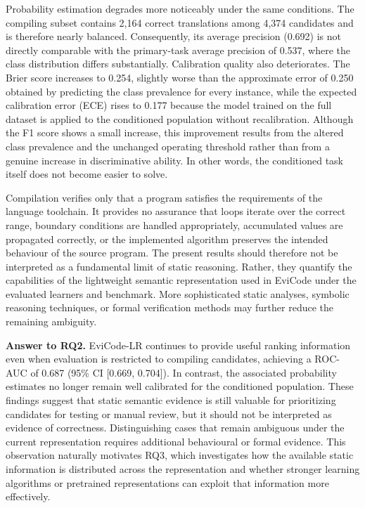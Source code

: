\documentclass[conference]{IEEEtran}
\begin{document}
Probability estimation degrades more noticeably under the same conditions. The compiling subset contains 2,164 correct translations among 4,374 candidates and is therefore nearly balanced. Consequently, its average precision (0.692) is not directly comparable with the primary-task average precision of 0.537, where the class distribution differs substantially. Calibration quality also deteriorates. The Brier score increases to 0.254, slightly worse than the approximate error of 0.250 obtained by predicting the class prevalence for every instance, while the expected calibration error (ECE) rises to 0.177 because the model trained on the full dataset is applied to the conditioned population without recalibration. Although the F1 score shows a small increase, this improvement results from the altered class prevalence and the unchanged operating threshold rather than from a genuine increase in discriminative ability. In other words, the conditioned task itself does not become easier to solve.

Compilation verifies only that a program satisfies the requirements of the language toolchain. It provides no assurance that loops iterate over the correct range, boundary conditions are handled appropriately, accumulated values are propagated correctly, or the implemented algorithm preserves the intended behaviour of the source program. The present results should therefore not be interpreted as a fundamental limit of static reasoning. Rather, they quantify the capabilities of the lightweight semantic representation used in EviCode under the evaluated learners and benchmark. More sophisticated static analyses, symbolic reasoning techniques, or formal verification methods may further reduce the remaining ambiguity.

\textbf{Answer to RQ2.} EviCode-LR continues to provide useful ranking information even when evaluation is restricted to compiling candidates, achieving a ROC-AUC of 0.687 (95\% CI [0.669, 0.704]). In contrast, the associated probability estimates no longer remain well calibrated for the conditioned population. These findings suggest that static semantic evidence is still valuable for prioritizing candidates for testing or manual review, but it should not be interpreted as evidence of correctness. Distinguishing cases that remain ambiguous under the current representation requires additional behavioural or formal evidence. This observation naturally motivates RQ3, which investigates how the available static information is distributed across the representation and whether stronger learning algorithms or pretrained representations can exploit that information more effectively.
\end{document}
